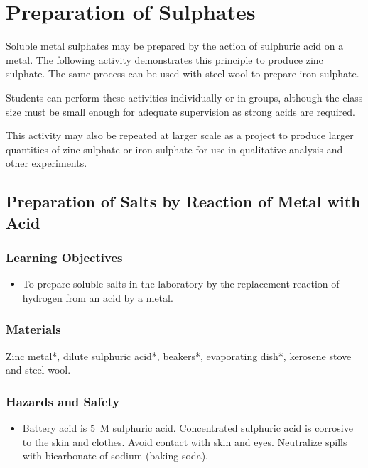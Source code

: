 \section{Preparation of Sulphates}

Soluble metal sulphates may be prepared by the action of sulphuric acid on a metal. The following activity demonstrates this principle to produce zinc sulphate. The same process can be used with steel wool to prepare iron sulphate.

Students can perform these activities individually or in groups, although the class size must be small enough for adequate supervision as strong acids are required.

This activity may also be repeated at larger scale as a project to produce larger quantities of zinc sulphate or iron sulphate for use in qualitative analysis and other experiments.

\subsection{Preparation of Salts by Reaction of Metal with Acid}

\subsubsection*{Learning Objectives}
\begin{itemize}
\item{To prepare soluble salts in the laboratory by the replacement reaction of hydrogen from an acid by a metal.}
\end{itemize}

\subsubsection*{Materials}
Zinc metal*, dilute sulphuric acid*, beakers*, evaporating dish*, kerosene stove and steel wool.

\subsubsection*{Hazards and Safety}
\begin{itemize}
\item{Battery acid is 5~M sulphuric acid. Concentrated sulphuric acid is corrosive to the skin and clothes. Avoid contact with skin and eyes. Neutralize spills with bicarbonate of sodium (baking soda).}
\end{itemize}

